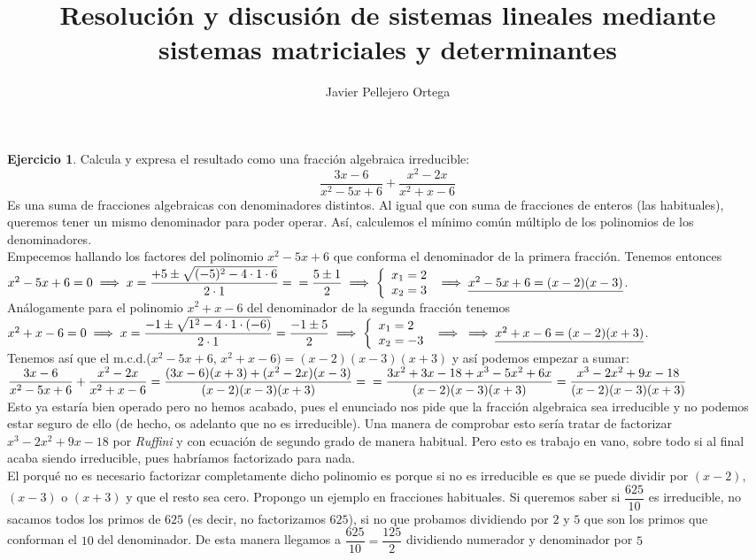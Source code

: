 \documentclass[11pt, oneside]{book}
\title{Resolución y discusión de sistemas lineales mediante sistemas matriciales y determinantes}
\author{Javier Pellejero Ortega}
\theoremstyle{definition} %
\newtheorem{ejercicio}{Ejercicio}
\newcommand{\doubleleft}[2]{ \left\{\begin{array}{ll}	#1 \\	#2 \\  \end{array}	\right. }
\begin{document}
\begin{ejercicio} Calcula y expresa el resultado como una fracción algebraica irreducible: \[\dfrac{3x-6}{x^2-5x+6}+\dfrac{x^2-2x}{x^2+x-6}\]
Es una suma de fracciones algebraicas con denominadores distintos. Al igual que con suma de fracciones de enteros (las habituales), queremos tener un mismo denominador para poder operar. Así, calculemos el mínimo común múltiplo de los polinomios de los denominadores.\\

Empecemos hallando los factores del polinomio $x^2 -5x +6$ que conforma el denominador de la primera fracción. Tenemos entonces $x^2 -5x +6=0\implies x = \dfrac{+5\pm\sqrt{(-5)^2-4\cdot1\cdot6}}{2\cdot1}=\\= \dfrac{5\pm1}{2}\implies \doubleleft{x_1=2}{x_2=3}\implies \underline{x^2 -5x +6 = (x-2)(x-3)}$.\\

Análogamente para el polinomio $x^2 +x -6$ del denominador de la segunda fracción tenemos $x^2 +x -6=0\implies x = \dfrac{-1\pm\sqrt{1^2-4\cdot1\cdot(-6)}}{2\cdot1}= \dfrac{-1\pm5}{2}\implies \doubleleft{x_1=2}{x_2=-3}\implies\\\implies \underline{x^2 +x -6 = (x-2)(x+3)}$.\\

Tenemos así que el m.c.d.($x^2 -5x +6$, $x^2 +x -6)= (x-2)(x-3)(x+3)$ y así podemos empezar a sumar:$\dfrac{3x-6}{x^2-5x+6}+\dfrac{x^2-2x}{x^2+x-6}=\dfrac{(3x-6)(x+3)+(x^2-2x)(x-3)}{(x-2)(x-3)(x+3)}=\\=\dfrac{3x^2+3x-18+x^3-5x^2+6x}{(x-2)(x-3)(x+3)}=\dfrac{x^3-2x^2+9x-18}{(x-2)(x-3)(x+3)}$\\

Esto ya estaría bien operado pero no hemos acabado, pues el enunciado nos pide que la fracción algebraica sea irreducible y no podemos estar seguro de ello (de hecho, os adelanto que no es irreducible). Una manera de comprobar esto sería tratar de factorizar\\ $x^3-2x^2+9x-18$ por \textit{Ruffini} y con ecuación de segundo grado de manera habitual. Pero esto es trabajo en vano, sobre todo si al final acaba siendo irreducible, pues habríamos factorizado para nada.\\

El porqué no es necesario factorizar completamente dicho polinomio es porque si no es irreducible es que se puede dividir por $(x-2)$, $(x-3)$ o $(x+3)$ y que el resto sea cero. Propongo un ejemplo en fracciones habituales. Si queremos saber si $\dfrac{625}{10}$ es irreducible, no sacamos todos los primos de $625$ (es decir, no factorizamos $625$), si no que probamos dividiendo por $2$ y $5$ que son los primos que conforman el $10$ del denominador. De esta manera llegamos a $\dfrac{625}{10}=\dfrac{125}{2}$ dividiendo numerador y denominador por $5$\\


\end{ejercicio}
\end{document}
